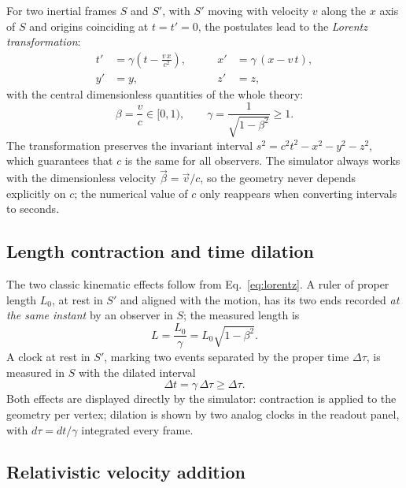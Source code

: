 \documentclass[10pt,a4paper,twocolumn]{article}
\begin{document}
For two inertial frames $S$ and $S'$, with $S'$ moving with velocity $v$ along the $x$
axis of $S$ and origins coinciding at $t = t' = 0$, the postulates lead to the
\emph{Lorentz transformation}:
\begin{equation}
  \begin{aligned}
    t' &= \gamma\left(t - \frac{v\,x}{c^{2}}\right), \qquad &
    x' &= \gamma\,(x - v\,t),\\
    y' &= y, & z' &= z,
  \end{aligned}
  \label{eq:lorentz}
\end{equation}
with the central dimensionless quantities of the whole theory:
\begin{equation}
  \beta = \frac{v}{c} \in [0,1), \qquad
  \gamma = \frac{1}{\sqrt{1-\beta^{2}}} \geq 1.
  \label{eq:gamma}
\end{equation}
The transformation preserves the invariant interval
$s^{2} = c^{2}t^{2} - x^{2} - y^{2} - z^{2}$, which guarantees that $c$ is the same for
all observers. The simulator always works with the dimensionless velocity
$\vec{\beta} = \vec{v}/c$, so the geometry never depends explicitly on $c$; the numerical
value of $c$ only reappears when converting intervals to seconds.

\subsection{Length contraction and time dilation}

The two classic kinematic effects follow from Eq.~\eqref{eq:lorentz}. A ruler of proper
length $L_{0}$, at rest in $S'$ and aligned with the motion, has its two ends recorded
\emph{at the same instant} by an observer in $S$; the measured length is
\begin{equation}
  L = \frac{L_{0}}{\gamma} = L_{0}\sqrt{1-\beta^{2}}.
  \label{eq:contracao}
\end{equation}
A clock at rest in $S'$, marking two events separated by the proper time $\Delta\tau$, is
measured in $S$ with the dilated interval
\begin{equation}
  \Delta t = \gamma\,\Delta\tau \geq \Delta\tau .
  \label{eq:dilatacao}
\end{equation}
Both effects are displayed directly by the simulator: contraction is applied to the
geometry per vertex; dilation is shown by two analog clocks in the readout panel, with
$d\tau = dt/\gamma$ integrated every frame.

\subsection{Relativistic velocity addition}
\end{document}
